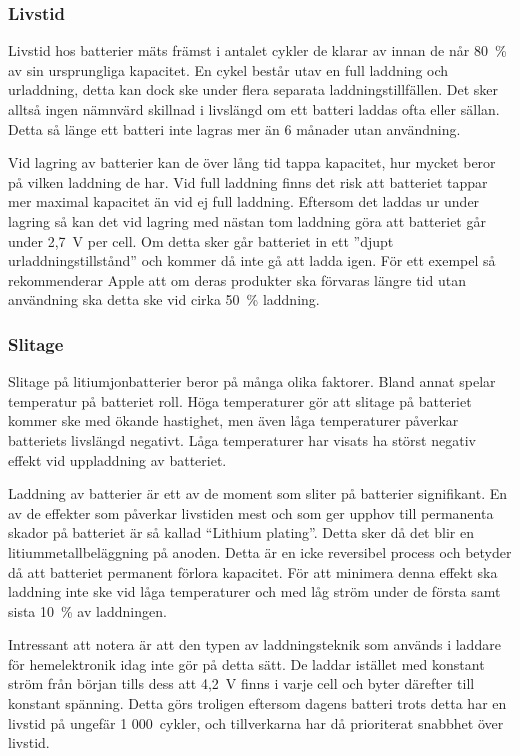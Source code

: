 \documentclass[a4paper,12pt]{article}
\begin{document}
\subsubsection{Livstid}
Livstid hos batterier mäts främst i antalet cykler de klarar av innan de når 80~\% av sin ursprungliga kapacitet. En cykel består utav en full laddning och urladdning, detta kan dock ske under flera separata laddningstillfällen. Det sker alltså ingen nämnvärd skillnad i livslängd om ett batteri laddas ofta eller sällan. Detta så länge ett batteri inte lagras mer än 6 månader utan användning.

Vid lagring av batterier kan de över lång tid tappa kapacitet, hur mycket beror på vilken laddning de har. Vid full laddning finns det risk att batteriet tappar mer maximal kapacitet än vid ej full laddning. Eftersom det laddas ur under lagring så kan det vid lagring med nästan tom laddning göra att batteriet går under 2,7~V per cell. Om detta sker går batteriet in ett ''djupt urladdningstillstånd'' och kommer då inte gå att ladda igen. För ett exempel så rekommenderar Apple att om deras produkter ska förvaras längre tid utan användning ska detta ske vid cirka 50~\% laddning. \cite{apple}

\subsubsection{Slitage}
\label{slitage}
Slitage på litiumjonbatterier beror på många olika faktorer. Bland annat spelar temperatur på batteriet roll. Höga temperaturer gör att slitage på batteriet kommer ske med ökande hastighet, men även låga temperaturer påverkar batteriets livslängd negativt. Låga temperaturer har visats ha störst negativ effekt vid uppladdning av batteriet. \cite{ageing}

Laddning av batterier är ett av de moment som sliter på batterier signifikant. En av de effekter som påverkar livstiden mest \cite{charging} och som ger upphov till permanenta skador på batteriet är så kallad “Lithium plating”. Detta sker då det blir en litiummetallbeläggning på anoden.\cite{nasa} Detta är en icke reversibel process och betyder då att batteriet permanent förlora kapacitet. För att minimera denna effekt ska laddning inte ske vid låga temperaturer och med låg ström under de första samt sista 10~\% av laddningen. \cite{charging-p}

Intressant att notera är att den typen av laddningsteknik som används i laddare för hemelektronik idag inte gör på detta sätt.\cite{apple} De laddar istället med konstant ström från början tills dess att 4,2~V finns i varje cell och byter därefter till konstant spänning. Detta görs troligen eftersom dagens batteri trots detta har en livstid på ungefär 1 000~cykler, och tillverkarna har då prioriterat snabbhet över livstid.
\end{document}
